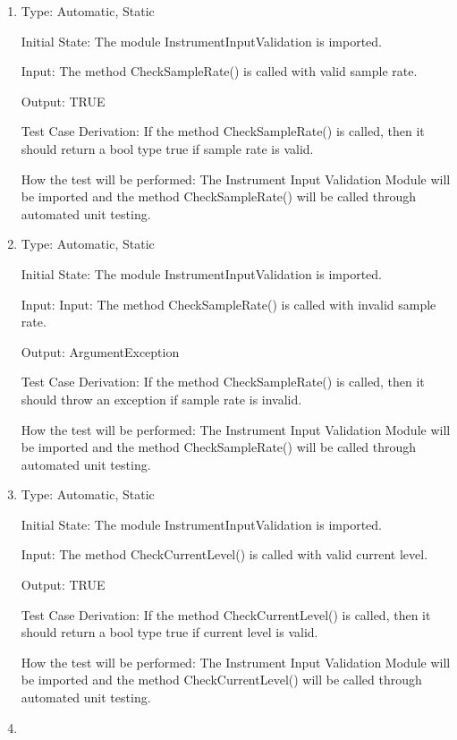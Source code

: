 \documentclass[12pt, titlepage]{article}
\begin{document}
\begin{enumerate}[{UT-II}1.]
  \item
  
  Type: Automatic, Static 

  Initial State: The module InstrumentInputValidation is imported.

  Input: The method CheckSampleRate() is called with valid sample rate.

  Output: TRUE 

  Test Case Derivation: If the method CheckSampleRate() is called, then it should return a bool type true if sample rate is valid.

  How the test will be performed: The Instrument Input Validation Module will be imported and the method CheckSampleRate() will be called through automated unit testing. 

  \item
  
  Type: Automatic, Static 

  Initial State: The module InstrumentInputValidation is imported.

  Input: Input: The method CheckSampleRate() is called with invalid sample rate.

  Output: ArgumentException

  Test Case Derivation: If the method CheckSampleRate() is called, then it should throw an exception if sample rate is invalid.

  How the test will be performed: The Instrument Input Validation Module will be imported and the method CheckSampleRate() will be called through automated unit testing.

  \item
  
  Type: Automatic, Static 

  Initial State: The module InstrumentInputValidation is imported.

  Input: The method CheckCurrentLevel() is called with valid current level.

  Output: TRUE 

  Test Case Derivation: If the method CheckCurrentLevel() is called, then it should return a bool type true if current level is valid.

  How the test will be performed: The Instrument Input Validation Module will be imported and the method CheckCurrentLevel() will be called through automated unit testing. 

  \item
  

\end{enumerate}
\end{document}
